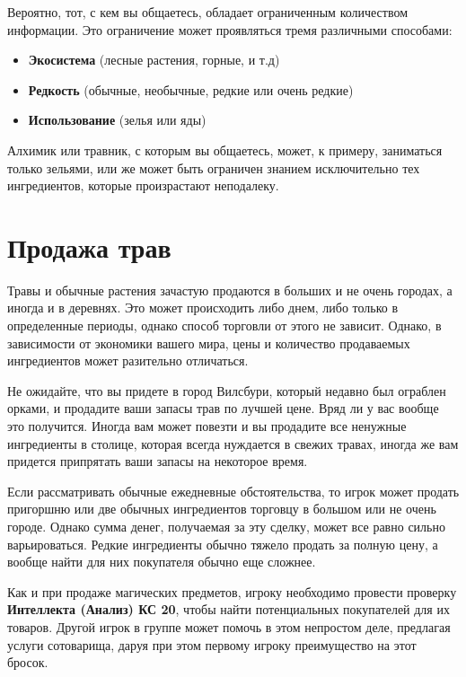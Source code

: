 \documentclass[a4paper, 9pt, twocolumn]{book}
\begin{document}
	Вероятно, тот, с кем вы общаетесь, обладает ограниченным количеством информации. Это ограничение может проявляться тремя различными способами:
	
	\begin{itemize}
		\item \textbf{Экосистема} (лесные растения, горные, и т.д)
		
		\item \textbf{Редкость} (обычные, необычные, редкие или очень редкие)
		
		\item \textbf{Использование} (зелья или яды)
	\end{itemize}

	Алхимик или травник, с которым вы общаетесь, может, к примеру, заниматься только зельями, или же может быть ограничен знанием исключительно тех ингредиентов, которые произрастают неподалеку.	
	
	\section{Продажа трав}
	
	Травы и обычные растения зачастую продаются в больших и не очень городах, а иногда и в деревнях. Это может происходить либо днем, либо только в определенные периоды, однако способ торговли от этого не зависит. Однако, в зависимости от экономики вашего мира, цены и количество продаваемых ингредиентов может разительно отличаться.
	
	Не ожидайте, что вы придете в город Вилсбури, который недавно был ограблен орками, и продадите ваши запасы трав по лучшей цене. Вряд ли у вас вообще это получится. Иногда вам может повезти и вы продадите все ненужные ингредиенты в столице, которая всегда нуждается в свежих травах, иногда же вам придется припрятать ваши запасы на некоторое время.
	
	Если рассматривать обычные ежедневные обстоятельства, то игрок может продать пригоршню или две обычных ингредиентов торговцу в большом или не очень городе. Однако сумма денег, получаемая за эту сделку, может все равно сильно варьироваться. Редкие ингредиенты обычно тяжело продать за полную цену, а вообще найти для них покупателя обычно еще сложнее.
	
	Как и при продаже магических предметов, игроку необходимо провести проверку \textbf{Интеллекта (Анализ) КС 20}, чтобы найти потенциальных покупателей для их товаров. Другой игрок в группе может помочь в этом непростом деле, предлагая услуги сотоварища, даруя при этом первому игроку преимущество на этот бросок.
	
\end{document}
